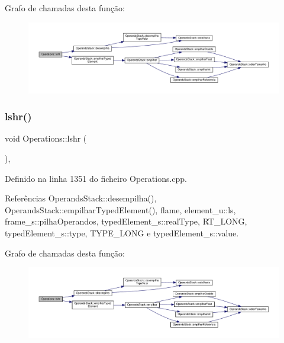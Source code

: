 Grafo de chamadas desta função\+:
\nopagebreak
\begin{figure}[H]
\begin{center}
\leavevmode
\includegraphics[width=350pt]{classOperations_a9d2b2a5ea74f26e6a5005ec9e99b24d9_cgraph}
\end{center}
\end{figure}
\mbox{\label{classOperations_aa886b0d027fb5b030016af6100541e81}} 
\subsubsection{\texorpdfstring{lshr()}{lshr()}}
{\footnotesize\ttfamily void Operations\+::lshr (\begin{DoxyParamCaption}{ }\end{DoxyParamCaption})\hspace{0.3cm}{\ttfamily [static]}, {\ttfamily [private]}}



Definido na linha 1351 do ficheiro Operations.\+cpp.



Referências Operands\+Stack\+::desempilha(), Operands\+Stack\+::empilhar\+Typed\+Element(), flame, element\+\_\+u\+::ls, frame\+\_\+s\+::pilha\+Operandos, typed\+Element\+\_\+s\+::real\+Type, R\+T\+\_\+\+L\+O\+NG, typed\+Element\+\_\+s\+::type, T\+Y\+P\+E\+\_\+\+L\+O\+NG e typed\+Element\+\_\+s\+::value.

Grafo de chamadas desta função\+:
\nopagebreak
\begin{figure}[H]
\begin{center}
\leavevmode
\includegraphics[width=350pt]{classOperations_aa886b0d027fb5b030016af6100541e81_cgraph}
\end{center}
\end{figure}
\mbox{\label{classOperations_a233917ec136fa6ce064f04b410e15f87}} 
